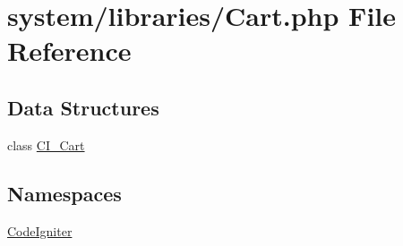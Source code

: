 \hypertarget{_cart_8php}{\section{system/libraries/\-Cart.php File Reference}
\label{_cart_8php}
}
\subsection*{Data Structures}
\begin{DoxyCompactItemize}
\item 
class \hyperlink{class_c_i___cart}{C\-I\-\_\-\-Cart}
\end{DoxyCompactItemize}
\subsection*{Namespaces}
\begin{DoxyCompactItemize}
\item 
\hyperlink{namespace_code_igniter}{Code\-Igniter}
\end{DoxyCompactItemize}
